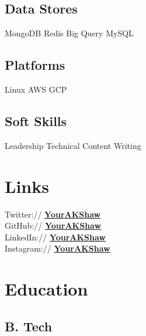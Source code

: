\documentclass[]{deedy-resume-openfont}
\begin{document}
\begin{minipage}[t]{0.33\textwidth}
\subsection{Data Stores}
MongoDB \textbullet{} Redis \textbullet{} Big Query \textbullet{} MySQL
\sectionsep

\subsection{Platforms}
Linux \textbullet{} AWS \textbullet{} GCP 
\sectionsep

\subsection{Soft Skills}
Leadership \textbullet{} Technical Content Writing 
\sectionsep


\section{Links} 
Twitter:// \href{https://twitter.com/YourAKShaw}{\bf YourAKShaw} \\
GitHub://  \href{https://github.com/YourAKShaw}{\bf YourAKShaw} \\
LinkedIn://  \href{https://www.linkedin.com/in/YourAKShaw}{\bf YourAKShaw} \\
Instagram://  \href{https://www.instagram.com/YourAKShaw}{\bf YourAKShaw} \\


\section{Education} 


\subsection{B. Tech} 
\sectionsep


\end{minipage}
\end{document}
